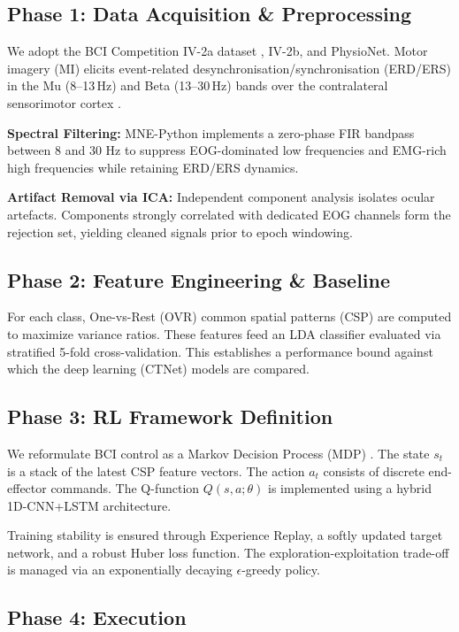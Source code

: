 \documentclass[12pt, a4paper]{article}
\begin{document}
\subsection{Phase 1: Data Acquisition \& Preprocessing}

We adopt the BCI Competition IV-2a dataset \cite{jeong2020multimodal}, IV-2b, and PhysioNet. Motor imagery (MI) elicits event-related desynchronisation/synchronisation (ERD/ERS) in the Mu (8--13\,Hz) and Beta (13--30\,Hz) bands over the contralateral sensorimotor cortex \cite{hameed2025enhancing}. 

\textbf{Spectral Filtering:} MNE-Python implements a zero-phase FIR bandpass between 8 and 30 Hz to suppress EOG-dominated low frequencies and EMG-rich high frequencies while retaining ERD/ERS dynamics.

\textbf{Artifact Removal via ICA:} Independent component analysis isolates ocular artefacts. Components strongly correlated with dedicated EOG channels form the rejection set, yielding cleaned signals prior to epoch windowing.

\subsection{Phase 2: Feature Engineering \& Baseline}

For each class, One-vs-Rest (OVR) common spatial patterns (CSP) are computed to maximize variance ratios. These features feed an LDA classifier evaluated via stratified 5-fold cross-validation. This establishes a performance bound against which the deep learning (CTNet) models are compared.

\subsection{Phase 3: RL Framework Definition}

We reformulate BCI control as a Markov Decision Process (MDP) \cite{nallani2024rleegnet}. The state $s_t$ is a stack of the latest CSP feature vectors. The action $a_t$ consists of discrete end-effector commands. The Q-function $Q(s,a;\theta)$ is implemented using a hybrid 1D-CNN+LSTM architecture. 

Training stability is ensured through Experience Replay, a softly updated target network, and a robust Huber loss function. The exploration-exploitation trade-off is managed via an exponentially decaying $\epsilon$-greedy policy.

\subsection{Phase 4: Execution}
\end{document}
